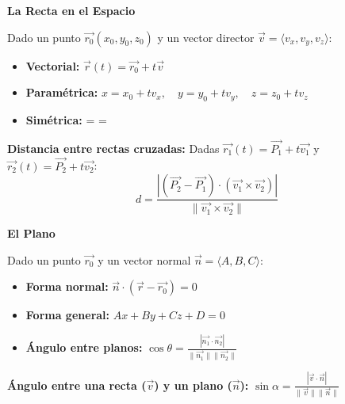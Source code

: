 \documentclass[10pt, landscape, twocolumn]{article}
\newcommand{\cheatsheetsubsection}[1]{
    \vspace{0.4em}
    {\color{themeblue}\normalsize\bfseries #1} \par
    \vspace{0.1em}
}
\begin{document}
\vspace{-0.5em}
\begin{center}
\end{center}
\vspace{-0.5em}

\cheatsheetsubsection{La Recta en el Espacio}
Dado un punto $\vec{r_0}(x_0, y_0, z_0)$ y un vector director $\vec{v} = \langle v_x, v_y, v_z \rangle$:
\begin{itemize}[leftmargin=*, nosep]
    \item \textbf{Vectorial:} $\vec{r}(t) = \vec{r_0} + t\vec{v}$
    \item \textbf{Paramétrica:} $x = x_0 + tv_x, \quad y = y_0 + tv_y, \quad z = z_0 + tv_z$
    \item \textbf{Simétrica:}  =  = 
\end{itemize}

\textbf{Distancia entre rectas cruzadas:} Dadas $\vec{r_1}(t) = \vec{P_1} + t\vec{v_1}$ y $\vec{r_2}(t) = \vec{P_2} + t\vec{v_2}$:
\[ d = \frac{|(\vec{P_2} - \vec{P_1}) \cdot (\vec{v_1} \times \vec{v_2})|}{\|\vec{v_1} \times \vec{v_2}\|} \]

\cheatsheetsubsection{El Plano}
Dado un punto $\vec{r_0}$ y un vector normal $\vec{n} = \langle A, B, C \rangle$:
\begin{itemize}[leftmargin=*, nosep]
    \item \textbf{Forma normal:} $\vec{n} \cdot (\vec{r} - \vec{r_0}) = 0$
    \item \textbf{Forma general:} $Ax + By + Cz + D = 0$
    \item \textbf{Ángulo entre planos:} $\cos \theta = \frac{|\vec{n_1} \cdot \vec{n_2}|}{\|\vec{n_1}\| \|\vec{n_2}\|}$
\end{itemize}

\textbf{Ángulo entre una recta ($\vec{v}$) y un plano ($\vec{n}$):} $\sin \alpha = \frac{|\vec{v} \cdot \vec{n}|}{\|\vec{v}\| \|\vec{n}\|}$
\end{document}
